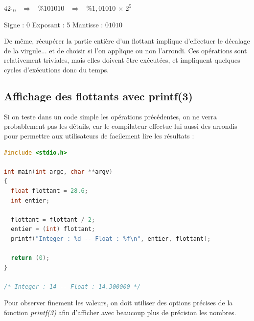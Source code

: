 \documentclass[11pt,a4paper]{article}
\begin{document}
\begin{center}
$ 42_{10}  \; \; \;  \Rightarrow  \; \; \;  \% 101010  \; \; \;  \Rightarrow  \; \; \;  \% 1,01010 \, \times \, 2^{5} $

\medskip

Signe : 0  \hspace*{0.5cm}  Exposant : 5  \hspace*{0.5cm}  Mantisse : $ 01010 $
\end{center}

\medskip

De même, récupérer la partie entière d'un flottant implique d'effectuer le décalage de la virgule... et de choisir si l'on applique ou non l'arrondi.
Ces opérations sont relativement triviales, mais elles doivent être exécutées, et impliquent quelques cycles d'exécutions donc du temps.



\subsection{Affichage des flottants avec printf(3)}

Si on teste dans un code simple les opérations précédentes, on ne verra probablement pas les détails, car le compilateur effectue lui aussi des arrondis pour permettre aux utilisateurs de facilement lire les résultats :

\bigskip

\begin{lstlisting}[language=C]
#include <stdio.h>

int main(int argc, char **argv)
{
  float flottant = 28.6;
  int entier;

  flottant = flottant / 2;
  entier = (int) flottant;
  printf("Integer : %d -- Float : %f\n", entier, flottant);

  return (0);
}

/* Integer : 14 -- Float : 14.300000 */
\end{lstlisting}

\bigskip

Pour observer finement les valeurs, on doit utiliser des options précises de la fonction \textit{printf(3)} afin d'afficher avec beaucoup plus de précision les nombres.

\bigskip
\end{document}
